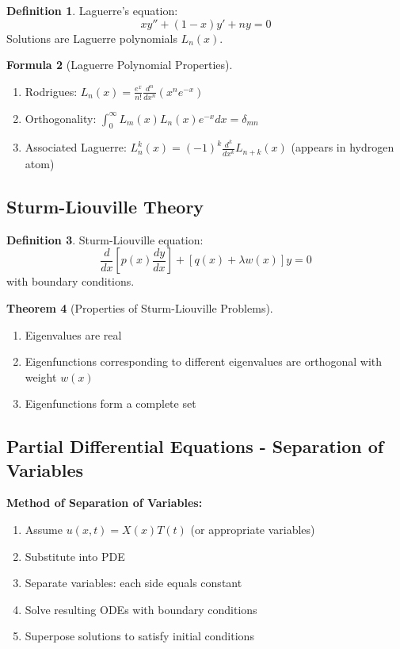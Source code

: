\documentclass[12pt,a4paper]{article}
\theoremstyle{definition}
\newtheorem{theorem}{Theorem}[section]
\newtheorem{definition}[theorem]{Definition}
\newtheorem{formula}[theorem]{Formula}
\begin{document}
\begin{definition}
Laguerre's equation:
\[
xy'' + (1-x)y' + ny = 0
\]
Solutions are Laguerre polynomials $L_n(x)$.
\end{definition}

\begin{formula}[Laguerre Polynomial Properties]
\begin{enumerate}
    \item Rodrigues: $L_n(x) = \frac{e^x}{n!}\frac{d^n}{dx^n}(x^n e^{-x})$
    
    \item Orthogonality: $\int_0^{\infty} L_m(x)L_n(x)e^{-x}dx = \delta_{mn}$
    
    \item Associated Laguerre: $L_n^k(x) = (-1)^k\frac{d^k}{dx^k}L_{n+k}(x)$ (appears in hydrogen atom)
\end{enumerate}
\end{formula}

\subsection{Sturm-Liouville Theory}

\begin{definition}
Sturm-Liouville equation:
\[
\frac{d}{dx}\left[p(x)\frac{dy}{dx}\right] + [q(x) + \lambda w(x)]y = 0
\]
with boundary conditions.
\end{definition}

\begin{theorem}[Properties of Sturm-Liouville Problems]
\begin{enumerate}
    \item Eigenvalues are real
    \item Eigenfunctions corresponding to different eigenvalues are orthogonal with weight $w(x)$
    \item Eigenfunctions form a complete set
\end{enumerate}
\end{theorem}

\subsection{Partial Differential Equations - Separation of Variables}

\begin{tipbox}
\textbf{Method of Separation of Variables:}
\begin{enumerate}
    \item Assume $u(x,t) = X(x)T(t)$ (or appropriate variables)
    \item Substitute into PDE
    \item Separate variables: each side equals constant
    \item Solve resulting ODEs with boundary conditions
    \item Superpose solutions to satisfy initial conditions
\end{enumerate}
\end{tipbox}
\end{document}
